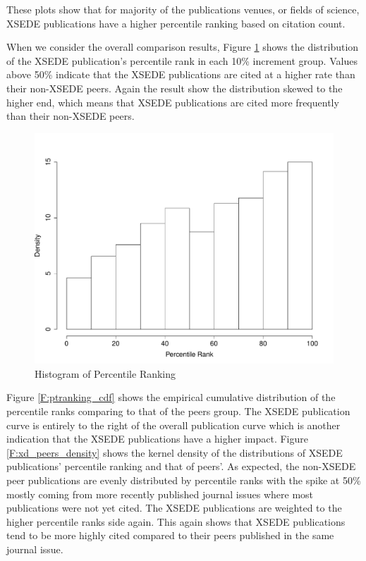 \documentclass{sig-alternate}
\begin{document}
These plots show that for majority of the publications venues, or fields of
science, XSEDE publications have a higher percentile ranking based on
citation count.

When we consider the overall comparison results, Figure
\ref{F:ptranking_hist} shows the distribution of the XSEDE
publication's percentile rank in each 10\% increment group. Values
above 50\% indicate that the XSEDE publications are cited at a higher
rate than their non-XSEDE peers.  Again the result show the
distribution skewed to the higher end, which means that XSEDE
publications are cited more frequently than their non-XSEDE peers.

\begin{figure}[htb!]
    \includegraphics[width=0.95\columnwidth]{images/ptranking_histogram.pdf}
    \caption{Histogram of Percentile Ranking}
    \label{F:ptranking_hist}
\end{figure}

Figure \ref{F:ptranking_cdf} shows the empirical cumulative
distribution of the percentile ranks comparing to that of the peers
group. The XSEDE publication curve is entirely to the right of the
overall publication curve which is another indication that the XSEDE
publications have a higher impact.  Figure \ref{F:xd_peers_density}
shows the kernel density of the distributions of XSEDE publications'
percentile ranking and that of peers'. As expected, the non-XSEDE peer
publications are evenly distributed by percentile ranks with the spike
at 50\% mostly coming from more recently published journal issues
where most publications were not yet cited. The XSEDE publications are
weighted to the higher percentile ranks side again. This again shows
that XSEDE publications tend to be more highly cited compared to their
peers published in the same journal issue.
\end{document}
